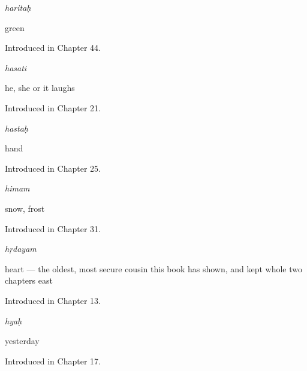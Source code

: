 \noindent\begin{minipage}[t]{\linewidth}
\raggedright
\textbf{}\enspace\emph{haritaḥ}\par
\small green\par
\footnotesize Introduced in Chapter 44.
\end{minipage}\par\medskip

\noindent\begin{minipage}[t]{\linewidth}
\raggedright
\textbf{}\enspace\emph{hasati}\par
\small he, she or it laughs\par
\footnotesize Introduced in Chapter 21.
\end{minipage}\par\medskip

\noindent\begin{minipage}[t]{\linewidth}
\raggedright
\textbf{}\enspace\emph{hastaḥ}\par
\small hand\par
\footnotesize Introduced in Chapter 25.
\end{minipage}\par\medskip

\noindent\begin{minipage}[t]{\linewidth}
\raggedright
\textbf{}\enspace\emph{himam}\par
\small snow, frost\par
\footnotesize Introduced in Chapter 31.
\end{minipage}\par\medskip

\noindent\begin{minipage}[t]{\linewidth}
\raggedright
\textbf{}\enspace\emph{hṛdayam}\par
\small heart — the oldest, most secure cousin this book has shown, and kept whole two chapters east\par
\footnotesize Introduced in Chapter 13.
\end{minipage}\par\medskip

\noindent\begin{minipage}[t]{\linewidth}
\raggedright
\textbf{}\enspace\emph{hyaḥ}\par
\small yesterday\par
\footnotesize Introduced in Chapter 17.
\end{minipage}\par\medskip


